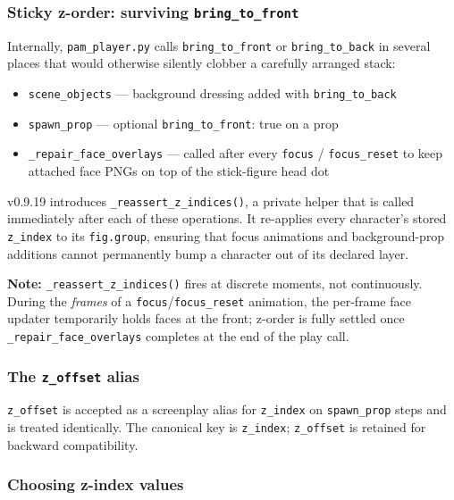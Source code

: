 \documentclass[
  12pt,
  letterpaper,
]{book}
\providecommand{\tightlist}{%
  \setlength{\itemsep}{0pt}\setlength{\parskip}{0pt}}
\begin{document}
\subsubsection{Sticky z-order: surviving \texttt{bring\_to\_front}}\label{sticky-z-order}

Internally, \texttt{pam\_player.py} calls \texttt{bring\_to\_front} or
\texttt{bring\_to\_back} in several places that would otherwise silently
clobber a carefully arranged stack:

\begin{itemize}
\tightlist
\item
  \texttt{scene\_objects} --- background dressing added with
  \texttt{bring\_to\_back}
\item
  \texttt{spawn\_prop} --- optional \texttt{bring\_to\_front}: true on a
  prop
\item
  \texttt{\_repair\_face\_overlays} --- called after every
  \texttt{focus} / \texttt{focus\_reset} to keep attached face PNGs on
  top of the stick-figure head dot
\end{itemize}

v0.9.19 introduces \texttt{\_reassert\_z\_indices()}, a private helper
that is called immediately after each of these operations. It re-applies
every character's stored \texttt{z\_index} to its \texttt{fig.group},
ensuring that focus animations and background-prop additions cannot
permanently bump a character out of its declared layer.

\textbf{Note:} \texttt{\_reassert\_z\_indices()} fires at discrete
moments, not continuously. During the \emph{frames} of a
\texttt{focus}/\texttt{focus\_reset} animation, the per-frame face
updater temporarily holds faces at the front; z-order is fully settled
once \texttt{\_repair\_face\_overlays} completes at the end of the play
call.

\subsubsection{The \texttt{z\_offset} alias}\label{z-offset-alias}

\texttt{z\_offset} is accepted as a screenplay alias for \texttt{z\_index}
on \texttt{spawn\_prop} steps and is treated identically. The canonical
key is \texttt{z\_index}; \texttt{z\_offset} is retained for backward
compatibility.

\subsubsection{Choosing z-index values}\label{choosing-z-index-values}
\end{document}
